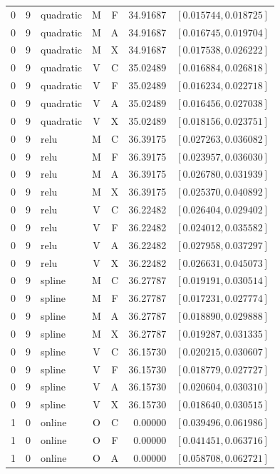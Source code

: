 \begin{longtable}{r r l c c r l}
0 & 9 & quadratic & M & F & 34.91687 & $[0.015744,0.018725]$ \\
0 & 9 & quadratic & M & A & 34.91687 & $[0.016745,0.019704]$ \\
0 & 9 & quadratic & M & X & 34.91687 & $[0.017538,0.026222]$ \\
0 & 9 & quadratic & V & C & 35.02489 & $[0.016884,0.026818]$ \\
0 & 9 & quadratic & V & F & 35.02489 & $[0.016234,0.022718]$ \\
0 & 9 & quadratic & V & A & 35.02489 & $[0.016456,0.027038]$ \\
0 & 9 & quadratic & V & X & 35.02489 & $[0.018156,0.023751]$ \\
0 & 9 & relu & M & C & 36.39175 & $[0.027263,0.036082]$ \\
0 & 9 & relu & M & F & 36.39175 & $[0.023957,0.036030]$ \\
0 & 9 & relu & M & A & 36.39175 & $[0.026780,0.031939]$ \\
0 & 9 & relu & M & X & 36.39175 & $[0.025370,0.040892]$ \\
0 & 9 & relu & V & C & 36.22482 & $[0.026404,0.029402]$ \\
0 & 9 & relu & V & F & 36.22482 & $[0.024012,0.035582]$ \\
0 & 9 & relu & V & A & 36.22482 & $[0.027958,0.037297]$ \\
0 & 9 & relu & V & X & 36.22482 & $[0.026631,0.045073]$ \\
0 & 9 & spline & M & C & 36.27787 & $[0.019191,0.030514]$ \\
0 & 9 & spline & M & F & 36.27787 & $[0.017231,0.027774]$ \\
0 & 9 & spline & M & A & 36.27787 & $[0.018890,0.029888]$ \\
0 & 9 & spline & M & X & 36.27787 & $[0.019287,0.031335]$ \\
0 & 9 & spline & V & C & 36.15730 & $[0.020215,0.030607]$ \\
0 & 9 & spline & V & F & 36.15730 & $[0.018779,0.027727]$ \\
0 & 9 & spline & V & A & 36.15730 & $[0.020604,0.030310]$ \\
0 & 9 & spline & V & X & 36.15730 & $[0.018640,0.030515]$ \\
1 & 0 & online & O & C & 0.00000 & $[0.039496,0.061986]$ \\
1 & 0 & online & O & F & 0.00000 & $[0.041451,0.063716]$ \\
1 & 0 & online & O & A & 0.00000 & $[0.058708,0.062721]$ \\

\end{longtable}
